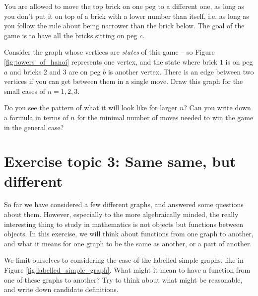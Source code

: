 \documentclass[nobib]{tufte-handout}
\begin{document}
You are allowed to move the top brick on one peg to a different one, as long as you don't put it on top of a brick with a lower number than itself, i.e. as long as you follow the rule about being narrower than the brick below. The goal of the game is to have all the bricks sitting on peg $c$.

\begin{xca}
  Consider the graph whose vertices are \emph{states} of this game -- so Figure \ref{fig:towers_of_hanoi} represents one vertex, and the state where brick $1$ is on peg $a$ and bricks $2$ and $3$ are on peg $b$ is another vertex. There is an edge between two vertices if you can get between them in a single move. Draw this graph for the small cases of $n=1, 2, 3$.

  Do you see the pattern of what it will look like for larger $n$? Can you write down a formula in terms of $n$ for the minimal number of moves needed to win the game in the general case?
\end{xca}

\section{Exercise topic 3: Same same, but different}

So far we have considered a few different graphs, and answered some questions about them. However, especially to the more algebraically minded, the really interesting thing to study in mathematics is not objects but functions between objects. In this exercise, we will think about functions from one graph to another, and what it means for one graph to be the same as another, or a part of another.

\begin{xca}
  We limit ourselves to considering the case of the labelled simple graphs, like in Figure \ref{fig:labelled_simple_graph}. What might it mean to have a function from one of these graphs to another? Try to think about what might be reasonable, and write down candidate definitions.
\end{xca}
\end{document}
